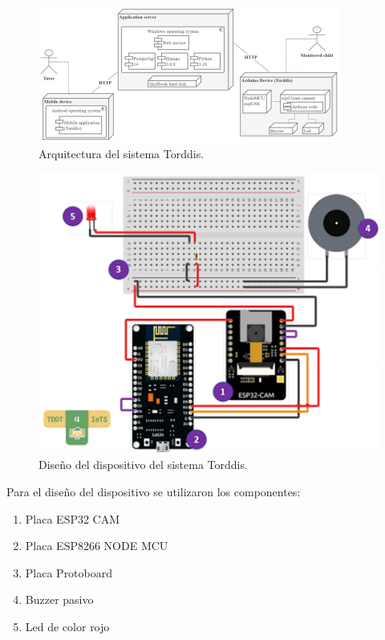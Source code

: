 \documentclass[a4paper,fleqn]{cas-sc}
\begin{document}
				\begin{figure}[hbt!]
					\centering
					\includegraphics[frame,scale=0.5, width=\linewidth]{figs/Figure_5}
					\caption{Arquitectura del sistema Torddis. \label{fig:TorddisArchitecture}}
				\end{figure} 
				
				\begin{figure}[hbt!]
					\centering
					\includegraphics[frame,scale=0.5, width=\linewidth]{figs/Figure_6}
					\caption{Diseño del dispositivo del sistema Torddis. \label{fig:TorddisDevice}}
				\end{figure} 
				
				Para el diseño del dispositivo se utilizaron los componentes:
				\begin{enumerate}
					\item Placa ESP32 CAM
					\item Placa ESP8266 NODE MCU
					\item Placa Protoboard
					\item Buzzer pasivo
					\item Led de color rojo
				\end{enumerate}
			
\end{document}
